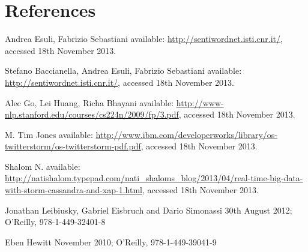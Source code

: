 \documentclass[a4paper]{article}
\begin{document}
\section{References}




\begin{thebibliography}{20}

	Andrea Esuli, Fabrizio Sebastiani
	\newblock available: \url{http://sentiwordnet.isti.cnr.it/}, accessed 18th November 2013.
	
	Stefano Baccianella, Andrea Esuli, Fabrizio Sebastiani
	\newblock available: \url{http://sentiwordnet.isti.cnr.it/}, accessed 18th November 2013.
	
	Alec Go, Lei Huang, Richa Bhayani
	\newblock available: \url{http://www-nlp.stanford.edu/courses/cs224n/2009/fp/3.pdf}, accessed 18th November 2013.
	
	M. Tim Jones
	\newblock available: \url{http://www.ibm.com/developerworks/library/os-twitterstorm/os-twitterstorm-pdf.pdf}, accessed 18th November 2013.
	
	Shalom N. 
	\newblock available: \url{http://natishalom.typepad.com/nati_shaloms_blog/2013/04/real-time-big-data-with-storm-cassandra-and-xap-1.html}, accessed 18th November 2013.

	Jonathan Leibiusky, Gabriel Eisbruch and Dario Simonassi 
	\newblock 30th August 2012; O'Reilly, 978-1-449-32401-8

	Eben Hewitt 
	\newblock November 2010; O'Reilly, 978-1-449-39041-9
	
	\newblock{}
	\newblock{}
	
		
\end{thebibliography}
\end{document}
